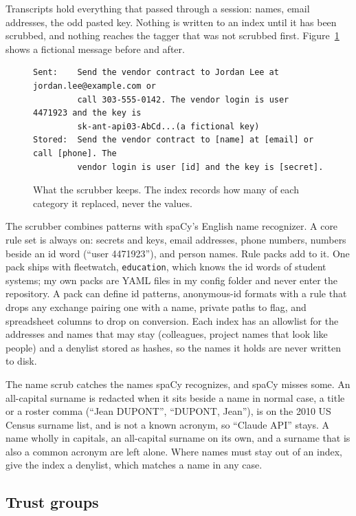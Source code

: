 \documentclass[11pt, letterpaper]{article}
\newenvironment{code}{\par\smallskip\small}{\par\smallskip}
\newcommand{\cmd}[1]{\texttt{#1}}
\begin{document}
Transcripts hold everything that passed through a session: names, email addresses, the odd
pasted key. Nothing is written to an index until it has been scrubbed, and nothing reaches
the tagger that was not scrubbed first. Figure~\ref{fig:scrub} shows a fictional message
before and after.

\begin{figure}[htbp]
\begin{code}
\begin{verbatim}
Sent:    Send the vendor contract to Jordan Lee at jordan.lee@example.com or
         call 303-555-0142. The vendor login is user 4471923 and the key is
         sk-ant-api03-AbCd...(a fictional key)
Stored:  Send the vendor contract to [name] at [email] or call [phone]. The
         vendor login is user [id] and the key is [secret].
\end{verbatim}
\end{code}
  \caption{What the scrubber keeps. The index records how many of each category it replaced,
    never the values.}
  \label{fig:scrub}
\end{figure}

The scrubber combines patterns with spaCy's English name recognizer. A core rule set is
always on: secrets and keys, email addresses, phone numbers, numbers beside an id word
(``user 4471923''), and person names. Rule packs add to it. One pack ships with fleetwatch,
\cmd{education}, which knows the id words of student systems; my own packs are YAML files in
my config folder and never enter the repository. A pack can define id patterns, anonymous-id
formats with a rule that drops any exchange pairing one with a name, private paths to flag,
and spreadsheet columns to drop on conversion. Each index has an allowlist for the addresses
and names that may stay (colleagues, project names that look like people) and a denylist
stored as hashes, so the names it holds are never written to disk.

The name scrub catches the names spaCy recognizes, and spaCy misses some. An all-capital
surname is redacted when it sits beside a name in normal case, a title or a roster comma
(``Jean DUPONT'', ``DUPONT, Jean''), is on the 2010 US Census surname list, and is not a
known acronym, so ``Claude API'' stays. A name wholly in capitals, an all-capital surname on
its own, and a surname that is also a common acronym are left alone. Where names must stay
out of an index, give the index a denylist, which matches a name in any case.

\subsection{Trust groups}
\end{document}
